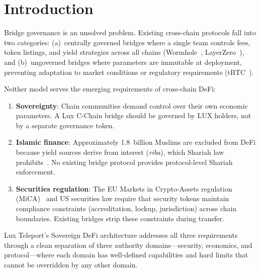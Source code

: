 \section{Introduction}

\label{sec:intro}

Bridge governance is an unsolved problem. Existing cross-chain protocols fall into two categories: (a)~centrally governed bridges where a single team controls fees, token listings, and yield strategies across all chains (Wormhole~\cite{wormhole}, LayerZero~\cite{layerzero}), and (b)~ungoverned bridges where parameters are immutable at deployment, preventing adaptation to market conditions or regulatory requirements (tBTC~\cite{tbtc}).

Neither model serves the emerging requirements of cross-chain DeFi:

\begin{enumerate}[nosep]
  \item \textbf{Sovereignty}: Chain communities demand control over their own economic parameters. A Lux C-Chain bridge should be governed by LUX holders, not by a separate governance token.
  \item \textbf{Islamic finance}: Approximately 1.8~billion Muslims are excluded from DeFi because yield sources derive from interest (\emph{riba}), which Shariah law prohibits~\cite{usmani2002}. No existing bridge protocol provides protocol-level Shariah enforcement.
  \item \textbf{Securities regulation}: The EU Markets in Crypto-Assets regulation (MiCA)~\cite{mica2023} and US securities law require that security tokens maintain compliance constraints (accreditation, lockup, jurisdiction) across chain boundaries. Existing bridges strip these constraints during transfer.
\end{enumerate}

Lux Teleport's Sovereign DeFi architecture addresses all three requirements through a clean separation of three authority domains---security, economics, and protocol---where each domain has well-defined capabilities and hard limits that cannot be overridden by any other domain.


